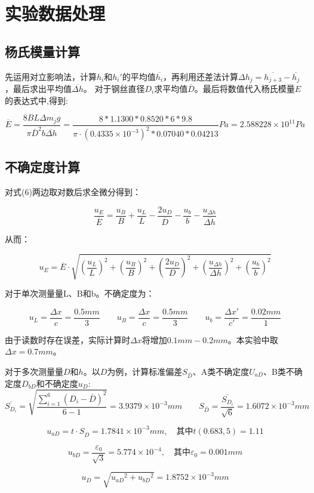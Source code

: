 \documentclass{article}
\begin{document}
\section{实验数据处理}
\subsection{杨氏模量计算}
先运用对立影响法，计算$h_i$和$h_i'$的平均值$\overline{h_i}$，再利用还差法计算$\Delta h_j=\overline{h_{j+3}}-\overline{h_j}$，最后求出平均值$\overline{\Delta h}$。
对于钢丝直径$D_i$求平均值$\overline{D}$。最后将数值代入杨氏模量$E$的表达式中,得到:

$$
\overline{E}=\frac{8BL\Delta m_jg}{\pi\overline{D}^2b\overline{\Delta h}}=\frac{8*1.1300*0.8520*6*9.8}{\pi·(0.4335\times 10^{-3})^2*0.07040*0.04213} Pa=2.588228\times 10^{11} Pa
$$

\subsection{不确定度计算}

对式(6)两边取对数后求全微分得到：

$$
\frac{u_E}{\overline{E}}=\frac{u_B}{B}+\frac{u_L}{L}-\frac{2u_D}{\overline{D}}-\frac{u_b}{b}-\frac{u_{\Delta h}}{\overline{\Delta h}}
$$

从而：

$$
u_E=\overline{E}\cdot\sqrt{(\frac{u_L}{L})^2+(\frac{u_B}{B})^2+(\frac{2u_D}{D})^2+(\frac{u_{\Delta h}}{\Delta h})^2+(\frac{u_b}{b})^2}
$$


对于单次测量量L、B和b。不确定度为：

$$
u_L=\frac{\Delta x}{c}=\frac{0.5mm}{3}\qquad u_B=\frac{\Delta x}{c}=\frac{0.5mm}{3}\qquad u_b=\frac{\Delta x'}{c'}=\frac{0.02mm}{1}
$$

由于读数时存在误差，实际计算时$\Delta x$将增加$0.1mm-0.2mm$。本实验中取$\Delta x=0.7mm$。

对于多次测量量$D$和$h$。以$D$为例，计算标准偏差$S_{\overline{D}}$、A类不确定度$U_{aD}$、B类不确定度$D_{bD}$和不确定度$u_D$:
$$
\overline{S_{D_{i}}}=\sqrt{\frac{\sum_{i = 1}^{6}(D_i-\overline{D})^2}{6-1}}=3.9379\times10^{-3}mm \qquad S_{\overline{D}}=\frac{\overline{S_{D_i}}}{\sqrt{6}}=1.6072\times10^{-3}mm
$$

$$
u_{aD}=t\cdot S_{\overline{D}}=1.7841\times10^{-3}mm,\quad 其中t(0.683,5)=1.11
$$

$$
u_{bD}=\frac{\varepsilon_0}{\sqrt{3}}=5.774\times 10^{-4},\quad 其中\varepsilon_0=0.001mm
$$

$$
u_D=\sqrt{{u_{aD}}^2+{u_{bD}}^2}=1.8752\times10^{-3}mm
$$
\end{document}
